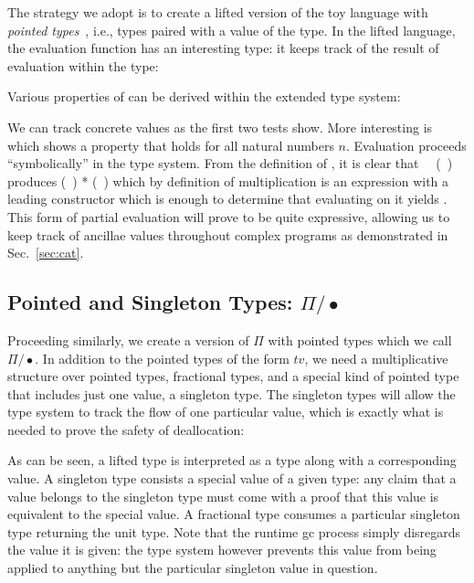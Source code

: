 \documentclass[sigplan,10pt,review,anonymous]{acmart}
\newcommand{\Afun}[1]{\AgdaFunction{#1}}
\newcommand{\Acon}[1]{\AgdaInductiveConstructor{#1}}
\newcommand{\Avar}[1]{\AgdaBound{#1}}
\begin{document}
The strategy we adopt is to create a lifted version of the toy
language with \emph{pointed types}~\cite{hottbook}, i.e., types paired with
a value of the type. In the lifted language, the evaluation
function has an interesting type: it keeps track of the result of
evaluation within the type:

\Jexamplecont{}

Various properties of
 can be derived within
the extended type system:

\Jexampletest{}

We can track concrete values as the first two tests
show. More interesting is  which shows a
property that holds for all natural numbers $n$. Evaluation
proceeds ``symbolically'' in the type system. From the definition
of \Afun{eval}, it is clear that
\Afun{eval}~\Acon{square}~(\Acon{suc}~\Avar{n}) produces
(\Acon{suc}~\Avar{n}) * (\Acon{suc}~\Avar{n}) which by definition of
multiplication is an expression with a leading \Acon{suc} constructor
which is enough to determine that evaluating
\Acon{isZero} on it yields \Acon{false}. This form of partial
evaluation will prove to be quite expressive, allowing us to keep track
of ancillae values throughout complex programs as demonstrated in
Sec.~\ref{sec:cat}.

\subsection{Pointed and Singleton Types: $\Pi/\bullet$}

Proceeding similarly, we create a
version of $\Pi$ with pointed types which we call
$\Pi/\bullet$. In addition to the pointed types of the form
$t$\Acon{\#}$v$, we need a multiplicative structure over pointed
types, fractional types, and a special kind of pointed type that
includes just one value, a singleton type. The singleton types will
allow the type system to track the flow of one particular value, which
is exactly what is needed to prove the safety of deallocation:

\PIPFUdef{}

As can be seen, a lifted type is interpreted as a type along with a
corresponding value. A singleton type consists a special value of a
given type: any claim that a value belongs to the singleton type must
come with a proof that this value is equivalent to the special
value. A fractional type consumes a particular singleton type
returning the unit type. Note that the runtime gc process simply
disregards the value it is given: the type system however prevents
this value from being applied to anything but the particular singleton
value in question.
\end{document}
